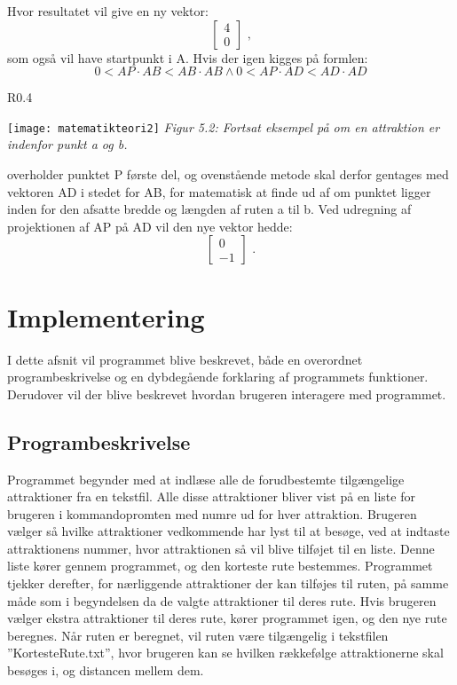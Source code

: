 Hvor resultatet vil give en ny vektor: \[ \begin{bmatrix} 4 \\ 0 \end{bmatrix} \text{ ,} \]  som også vil have startpunkt i A. Hvis der igen kigges på formlen:
\[0 < AP \cdot AB < AB \cdot AB \wedge 0 < AP \cdot AD < AD \cdot AD \]
\begin{wrapfigure}{R}{0.4\textwidth}
  \vspace{-20pt}
  \begin{center}
    \texttt{[image: matematikteori2]} \newline
    \textit{Figur 5.2: Fortsat eksempel på om en attraktion er indenfor punkt a og b.}\newline
  \end{center}
  \vspace{-20pt}
\end{wrapfigure}

overholder punktet P første del, og ovenstående metode skal derfor gentages med vektoren AD i stedet for AB, for matematisk at finde ud af om punktet ligger inden 	for den afsatte bredde og længden af ruten a til b. Ved udregning af projektionen af AP på AD vil den nye vektor hedde: \[ \begin{bmatrix} 0 \\ -1 \end{bmatrix} \text{ .} \]\newline
\newline



\section{Implementering}

I dette afsnit vil programmet blive beskrevet, både en overordnet programbeskrivelse og en dybdegående forklaring af programmets funktioner. Derudover vil der blive beskrevet hvordan brugeren interagere med programmet. 

\subsection{Programbeskrivelse}
Programmet begynder med at indlæse alle de forudbestemte tilgængelige attraktioner fra en tekstfil. Alle disse attraktioner bliver vist på en liste for brugeren i kommandopromten med numre ud for hver attraktion. Brugeren vælger så hvilke attraktioner vedkommende har lyst til at besøge, ved at indtaste attraktionens nummer, hvor attraktionen så vil blive tilføjet til en liste. Denne liste kører gennem programmet, og den korteste rute bestemmes. Programmet tjekker derefter, for nærliggende attraktioner der kan tilføjes til ruten, på samme måde som i begyndelsen da de valgte attraktioner til deres rute. Hvis brugeren vælger ekstra attraktioner til deres rute, kører programmet igen, og den nye rute beregnes. Når ruten er beregnet, vil ruten være tilgængelig i tekstfilen ”KortesteRute.txt”, hvor brugeren kan se hvilken rækkefølge attraktionerne skal besøges i, og distancen mellem dem. 

